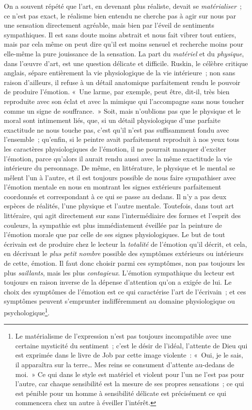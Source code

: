 \documentclass[french,twoside]{book} %
\begin{document}
On a souvent répété que l’art, en devenant plus réaliste, devait se \emph{matérialiser} ; ce n’est pas exact, le réalisme bien entendu ne cherche pas à agir sur nous par une sensation directement agréable, mais bien par l’éveil de sentiments sympathiques. Il est sans doute moins abstrait et nous fait vibrer tout entiers, mais par cela même on peut dire qu’il est moins sensuel et recherche moins pour elle-même la pure jouissance de la sensation. La part du \emph{matériel} et du \emph{physique}, dans l’œuvre d’art, est une question délicate et difficile. Ruskin, le célèbre critique anglais, sépare entièrement la vie physiologique de la vie intérieure ; non sans raison d’ailleurs, il refuse à un détail anatomique parfaitement rendu le pouvoir de produire l’émotion. « Une larme, par exemple, peut être, dit-il, très bien reproduite avec son éclat et avec la mimique qui l’accompagne sans nous toucher comme un signe de souffrance. » Soit, mais n’oublions pas que le physique et le moral sont intimement liés, que, si un détail physiologique d’une parfaite exactitude ne nous touche pas, c’est qu’il n’est pas suffisamment fondu avec l’ensemble ; qu’enfin, si le peintre avait parfaitement reproduit à nos yeux tous les caractères physiologiques de l’émotion, il ne pourrait manquer d’exciter l’émotion, parce qu’alors il aurait rendu aussi avec la même exactitude la vie intérieure du personnage. De même, en littérature, le physique et le mental se mêlent l’un à l’autre, et il est toujours possible de nous faire sympathiser avec l’émotion mentale en nous en montrant les signes extérieurs parfaitement coordonnés et correspondant à ce qui se passe au dedans. Il n’y a pas deux espèces de réalités, l’une physique et l’autre mentale. Toutefois, dans tout art littéraire, qui agit directement sur sans l’intermédiaire des formes et l’esprit des couleurs, la sympathie est plus immédiatement éveillée par la peinture de l’émotion morale que par celle de ses signes physiologiques. Le but de tout écrivain est de produire chez le lecteur la \emph{totalité} de l’émotion qu’il décrit, et cela, en décrivant le \emph{plus petit nombre} possible des symptômes extérieurs ou intérieurs de cette, émotion. Il faut donc choisir parmi ces symptômes, non pas toujours les plus \emph{saillants}, mais les plus \emph{contagieux}. L’émotion sympathique du lecteur est toujours en raison inverse de la dépense d’attention qu’on a exigée de lui. Le choix des symptômes de l’émotion est ce qui caractérise l’art de l’écrivain ; et ces symptômes peuvent s’emprunter indifféremment au domaine physiologique ou psychologique\footnote{Le matérialisme de l’expression n’est pas toujours incompatible avec une certaine mysticité du sentiment ; c’est le désir de l’idéal, l’attente de Dieu qui est exprimée dans le livre de Job par cette image violente : « Oui, je le sais, il apparaîtra sur la terre… Mes reins se consument d’attente au-dedans de moi. » Ce qui dans le style est matériel et violent pour l’un ne l’est pas pour l’autre, car chaque sensibilité est la mesure de ses propres sensations ; ce qui est pénible pour un homme à sensibilité délicate est précisément ce qui commencera chez un autre à éveiller l’intérêt.}.\par
\end{document}
